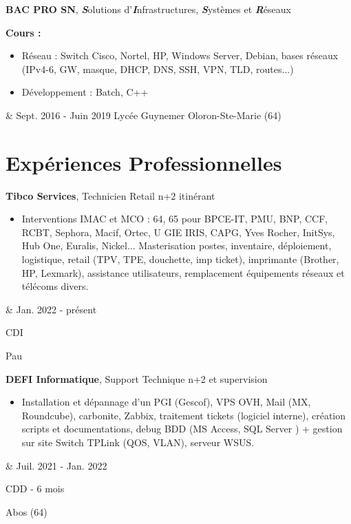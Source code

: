 \documentclass[10pt, fr-FR]{article}
\newenvironment{highlights}{\begin{itemize}[topsep=0pt,parsep=0.10 cm,partopsep=0pt,itemsep=0pt,after=\vspace{-1\baselineskip},leftmargin=0.4 cm + 3pt]}{\end{itemize}}
\let\originalTabularx\tabularx
\let\originalEndTabularx\endtabularx
\renewenvironment{tabularx}{\bgroup\centering\originalTabularx}{\originalEndTabularx\par\egroup}
\begin{document}
\begin{tabularx}{
		\textwidth-0.4 cm-0.13cm
	}{
		K{0.2 cm}
		R{4.1 cm}
	}
	\textbf{BAC PRO SN}, \textbf{\textit{S}}olutions d'\textbf{\textit{I}}nfrastructures, \textbf{\textit{S}}ystèmes et \textbf{\textit{R}}éseaux

	\hspace{0 cm}
	\textbf{Cours :}
	\vspace{0.10 cm}

	\begin{highlights}
		\item Réseau : Switch Cisco, Nortel, HP, Windows Server, Debian, bases réseaux (IPv4-6, GW, masque, DHCP, DNS, SSH, VPN, TLD, routes...)
		\item Développement : Batch, C++
	\end{highlights}
	 &
	Sept. 2016 - Juin 2019
	Lycée Guynemer
	Oloron-Ste-Marie (64)
\end{tabularx}

\section{Expériences Professionnelles}

\begin{tabularx}{
		\textwidth-0.4 cm-0.13cm
	}{
		K{0.2 cm}
		R{4.1 cm}
	}
	\textbf{Tibco Services}, Technicien Retail n+2 itinérant
	\vspace{0.10 cm}
	\begin{highlights}
		\item Interventions IMAC et MCO : 64, 65 pour BPCE-IT, PMU, BNP, CCF, RCBT, Sephora, Macif, Ortec, U GIE IRIS, CAPG, Yves Rocher, InitSys, Hub One, Euralis, Nickel... Masterisation postes, inventaire, déploiement, logistique, retail (TPV, TPE, douchette, imp ticket), imprimante (Brother, HP, Lexmark), assistance utilisateurs, remplacement équipements réseaux et télécoms divers.
	\end{highlights}
	 &
	Jan. 2022 - présent

    CDI

    Pau
\end{tabularx}

\vspace{0.2 cm}

\begin{tabularx}{
		\textwidth-0.4 cm-0.13cm
	}{
		K{0.2 cm}
		R{4.1 cm}
	}
	\textbf{DEFI Informatique}, Support Technique n+2 et supervision
	\vspace{0.10 cm}
	\begin{highlights}
		\item Installation et dépannage d'un PGI (Gescof), VPS OVH, Mail (MX, Roundcube), carbonite, Zabbix, traitement tickets (logiciel interne), création scripts et documentations, debug BDD (MS Access, SQL Server ) + gestion sur site
		Switch TPLink (QOS, VLAN), serveur WSUS. \end{highlights}
	 &
	Juil. 2021 - Jan. 2022

	CDD - 6 mois

	Abos (64)
\end{tabularx}
\end{document}
